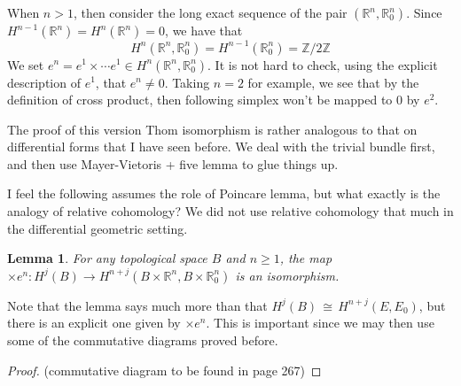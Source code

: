 \documentclass[12pt]{article}
\theoremstyle{plain}
\newtheorem{lemma}[equation]{Lemma}
\theoremstyle{definition}
\newcommand{\IR}{\mathbb{R}}
\newcommand{\IZ}{\mathbb{Z}}
\newcommand\iso{\,{\cong}\,}
\newcommand{\<}{\langle}
\renewcommand{\>}{\rangle}
\begin{document}
When $n > 1$, then consider the long exact sequence of the pair $(\IR^n, \IR^n_0)$. Since $H^{n - 1}(\IR^n) = H^n(\IR^n) = 0$, we have that $$H^n(\IR^n, \IR^n_0) = H^{n - 1}(\IR^n_0) = \IZ / 2\IZ$$ 
We set $e^n = e^1 \times \cdots e^1 \in H^n(\IR^n, \IR^n_0)$. It is not hard to check, using the explicit description of $e^1$, that $e^n \neq 0$. Taking $n = 2$ for example, we see that by the definition of cross product, then following simplex won't be mapped to $0$ by $e^2$. 

The proof of this version Thom isomorphism is rather analogous to that on differential forms that I have seen before. We deal with the trivial bundle first, and then use Mayer-Vietoris + five lemma to glue things up.  

I feel the following assumes the role of Poincare lemma, but what exactly is the analogy of relative cohomology? We did not use relative cohomology that much in the differential geometric setting. 
\begin{lemma}
For any topological space $B$ and $n \ge 1$, the map $\times e^n : H^j(B) \to H^{n + j}(B \times \IR^n, B \times \IR^n_0)$ is an isomorphism. 
\end{lemma}
Note that the lemma says much more than that $H^j(B) \iso H^{n + j}(E, E_0)$, but there is an explicit one given by $\times e^n$. This is important since we may then use some of the commutative diagrams proved before. 
\begin{proof}
(commutative diagram to be found in page 267)
\end{proof}
\end{document}
